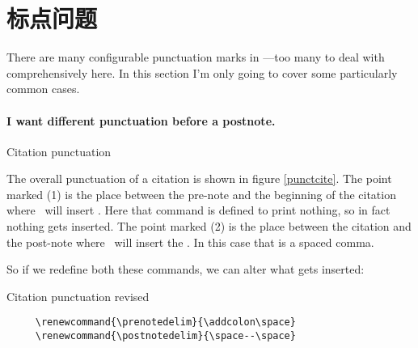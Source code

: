 \section{标点问题}\label{sec:punctuation}

There are many configurable punctuation marks in \biblatex---too many
to deal with comprehensively here. In this section I'm only going to
cover some particularly common cases.

\paragraph{I want different punctuation before a postnote.}
\begin{marginfigure}
\vspace{3pt}%
\caption{Citation punctuation}\label{punctcite}
\end{marginfigure}
The overall punctuation of a citation is shown in figure
\ref{punctcite}. The point marked (1) is the place between the
pre-note and the beginning of the citation where \biblatex\ will
insert . Here that command is defined to print
nothing, so in fact nothing gets inserted. The point marked (2) is the
place between the citation and the post-note where \biblatex\ will
insert the . In this case that is a spaced comma.

So if we redefine both these commands, we can alter what gets
inserted:\begin{marginfigure}[12ex]
 \vspace{3pt}%
\caption{Citation punctuation revised}\label{punctcite2}
\end{marginfigure}
\begin{Verbatim}
     \renewcommand{\prenotedelim}{\addcolon\space}
     \renewcommand{\postnotedelim}{\space--\space}
\end{Verbatim}

